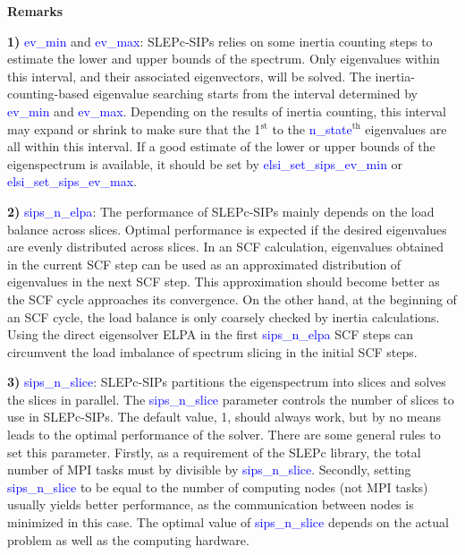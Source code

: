 \documentclass{report}
\begin{document}
\textbf{Remarks}

\textbf{1)} \textcolor{blue}{ev\_min} and \textcolor{blue}{ev\_max}:  SLEPc-SIPs relies on some inertia counting steps to estimate the lower and upper bounds of the spectrum.  Only eigenvalues within this interval, and their associated eigenvectors, will be solved.  The inertia-counting-based eigenvalue searching starts from the interval determined by \textcolor{blue}{ev\_min} and \textcolor{blue}{ev\_max}.  Depending on the results of inertia counting, this interval may expand or shrink to make sure that the 1$^\text{st}$ to the \textcolor{blue}{n\_state}$^\text{th}$ eigenvalues are all within this interval.  If a good estimate of the lower or upper bounds of the eigenspectrum is available, it should be set by \textcolor{blue}{elsi\_set\_sips\_ev\_min} or \textcolor{blue}{elsi\_set\_sips\_ev\_max}.

\textbf{2)} \textcolor{blue}{sips\_n\_elpa}:  The performance of SLEPc-SIPs mainly depends on the load balance across slices.  Optimal performance is expected if the desired eigenvalues are evenly distributed across slices.  In an SCF calculation, eigenvalues obtained in the current SCF step can be used as an approximated distribution of eigenvalues in the next SCF step.  This approximation should become better as the SCF cycle approaches its convergence.  On the other hand, at the beginning of an SCF cycle, the load balance is only coarsely checked by inertia calculations.  Using the direct eigensolver ELPA in the first \textcolor{blue}{sips\_n\_elpa} SCF steps can circumvent the load imbalance of spectrum slicing in the initial SCF steps.

\textbf{3)} \textcolor{blue}{sips\_n\_slice}:  SLEPc-SIPs partitions the eigenspectrum into slices and solves the slices in parallel.  The \textcolor{blue}{sips\_n\_slice} parameter controls the number of slices to use in SLEPc-SIPs.  The default value, 1, should always work, but by no means leads to the optimal performance of the solver.  There are some general rules to set this parameter.  Firstly, as a requirement of the SLEPc library, the total number of MPI tasks must by divisible by \textcolor{blue}{sips\_n\_slice}.  Secondly, setting \textcolor{blue}{sips\_n\_slice} to be equal to the number of computing nodes (not MPI tasks) usually yields better performance, as the communication between nodes is minimized in this case.  The optimal value of \textcolor{blue}{sips\_n\_slice} depends on the actual problem as well as the computing hardware.
\end{document}
